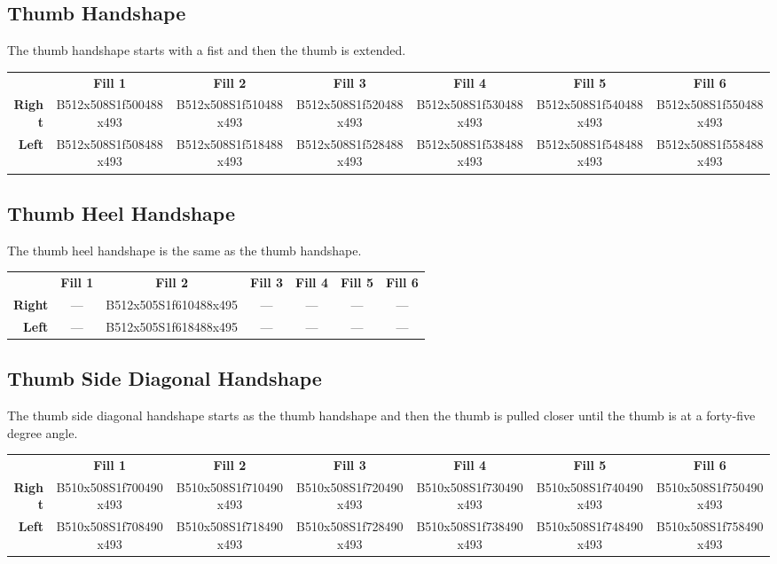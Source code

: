 \documentclass{article}
\begin{document}
\subsection{Thumb Handshape}

The thumb handshape starts with a fist and then the thumb is extended.

\begin{center}
\begin{tabular}{r*{6}{c}}
&\textbf{Fill 1}&\textbf{Fill 2}&\textbf{Fill 3}&\textbf{Fill 4}&\textbf{Fill 5}&\textbf{Fill 6}\\
\textbf{Right}&
B512x508S1f500488x493&
B512x508S1f510488x493&
B512x508S1f520488x493&
B512x508S1f530488x493&
B512x508S1f540488x493&
B512x508S1f550488x493\\
\textbf{Left}&
B512x508S1f508488x493&
B512x508S1f518488x493&
B512x508S1f528488x493&
B512x508S1f538488x493&
B512x508S1f548488x493&
B512x508S1f558488x493\\
\end{tabular}
\end{center}

\subsection{Thumb Heel Handshape}

The thumb heel handshape is the same as the thumb handshape.

\begin{center}
\begin{tabular}{r*{6}{c}}
&\textbf{Fill 1}&\textbf{Fill 2}&\textbf{Fill 3}&\textbf{Fill 4}&\textbf{Fill 5}&\textbf{Fill 6}\\
\textbf{Right}&
---&
B512x505S1f610488x495&
---&
---&
---&
---\\
\textbf{Left}&
---&
B512x505S1f618488x495&
---&
---&
---&
---\\
\end{tabular}
\end{center}

\subsection{Thumb Side Diagonal Handshape}

The thumb side diagonal handshape starts as the thumb handshape and then the thumb is pulled closer until the thumb is at a forty-five degree angle.

\begin{center}
\begin{tabular}{r*{6}{c}}
&\textbf{Fill 1}&\textbf{Fill 2}&\textbf{Fill 3}&\textbf{Fill 4}&\textbf{Fill 5}&\textbf{Fill 6}\\
\textbf{Right}&
B510x508S1f700490x493&
B510x508S1f710490x493&
B510x508S1f720490x493&
B510x508S1f730490x493&
B510x508S1f740490x493&
B510x508S1f750490x493\\
\textbf{Left}&
B510x508S1f708490x493&
B510x508S1f718490x493&
B510x508S1f728490x493&
B510x508S1f738490x493&
B510x508S1f748490x493&
B510x508S1f758490x493\\
\end{tabular}
\end{center}
\end{document}
